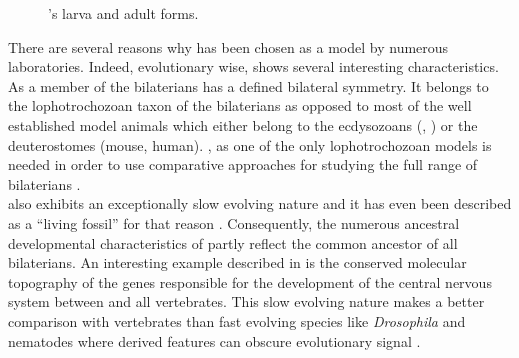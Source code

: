      
\begin{figure}[bth]
        \myfloatalign
         \quad
        \caption{\platyfull{}'s larva and adult forms.}\label{fig:platynereis}
\end{figure}
     
     There are several reasons why \platy{} has been chosen as a model by numerous laboratories. Indeed, evolutionary wise, \platy{} shows several interesting characteristics.  As a member of the bilaterians \platy{} has a defined bilateral symmetry. It belongs to the lophotrochozoan taxon of the bilaterians as opposed to most of the well established model animals which either belong to the ecdysozoans (, ) or the deuterostomes (mouse, human). \platy{}, as one of the only lophotrochozoan models is needed in order to use comparative approaches for studying the full range of bilaterians \citep{Fischer10}.\\
     
     \platy{} also exhibits an exceptionally slow evolving nature and it has even been described as a ``living fossil'' for that reason \citep{Fischer10}. Consequently, the numerous ancestral developmental characteristics of \platy{} partly reflect the common ancestor of all bilaterians. An interesting example described in \citep{denes07,tessmar07} is the conserved molecular topography of the genes responsible for the development of the central nervous system between \platy{} and all vertebrates. This slow evolving nature makes \platy{} a better comparison with vertebrates than fast evolving species like \emph{Drosophila} and nematodes where derived features can obscure evolutionary signal \citep{Fischer10,arendt124}.\\
     
